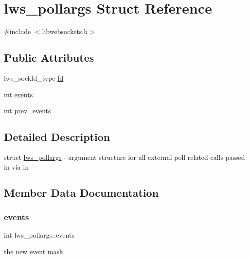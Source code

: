 \hypertarget{structlws__pollargs}{}\section{lws\+\_\+pollargs Struct Reference}
\label{structlws__pollargs}


{\ttfamily \#include $<$libwebsockets.\+h$>$}

\subsection*{Public Attributes}
\begin{DoxyCompactItemize}
\item 
lws\+\_\+sockfd\+\_\+type \hyperlink{structlws__pollargs_af14a48ef4e78128aef9a76902b104a81}{fd}
\item 
int \hyperlink{structlws__pollargs_a00bbffea9f55de342783e32d71ce1de6}{events}
\item 
int \hyperlink{structlws__pollargs_a437fec0de5cf264371e1ab5a401e86d8}{prev\+\_\+events}
\end{DoxyCompactItemize}


\subsection{Detailed Description}
struct \hyperlink{structlws__pollargs}{lws\+\_\+pollargs} -\/ argument structure for all external poll related calls passed in via \textquotesingle{}in\textquotesingle{} 

\subsection{Member Data Documentation}
\mbox{\label{structlws__pollargs_a00bbffea9f55de342783e32d71ce1de6}} 
\subsubsection{\texorpdfstring{events}{events}}
{\footnotesize\ttfamily int lws\+\_\+pollargs\+::events}

the new event mask \mbox{\label{structlws__pollargs_af14a48ef4e78128aef9a76902b104a81}} 
